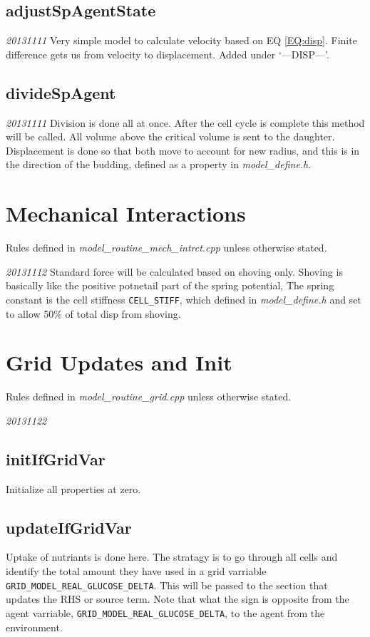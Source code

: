 \documentclass{article}
\begin{document}
\subsection{adjustSpAgentState}
\emph{20131111} Very simple model to calculate velocity based on EQ \ref{EQ:disp}.
Finite difference gets us from velocity to displacement.
Added under `---DISP---'.

\subsection{divideSpAgent}
\emph{20131111} Division is done all at once.  
After the cell cycle is complete this method will be called.
All volume above the critical volume is sent to the daughter.
Displacement is done so that both move to account for new radius, 
and this is in the direction of the budding, defined as a property in \textit{model\_define.h}.
 

\section{Mechanical Interactions}
Rules defined in \textit{model\_routine\_mech\_intrct.cpp} unless otherwise stated.

\emph{20131112} Standard force will be calculated based on shoving only.
Shoving is basically like the positive potnetail part of the spring potential,
The spring constant is the cell stiffness \texttt{CELL\_STIFF}, 
which defined in \textit{model\_define.h} and set to allow 50\% of total disp from shoving.


\section{Grid Updates and Init}
Rules defined in \textit{model\_routine\_grid.cpp} unless otherwise stated.

\emph{20131122} 
\subsection{initIfGridVar}
Initialize all properties at zero.

\subsection{updateIfGridVar}
Uptake of nutriants is done here. 
The stratagy is to go through all cells and identify the total amount they have used in a grid varriable \texttt{GRID\_MODEL\_REAL\_GLUCOSE\_DELTA}.
This will be passed to the section that updates the RHS or source term.
Note that what the sign is opposite from the agent varriable, \texttt{GRID\_MODEL\_REAL\_GLUCOSE\_DELTA}, 
to the agent from the environment.
\end{document}
